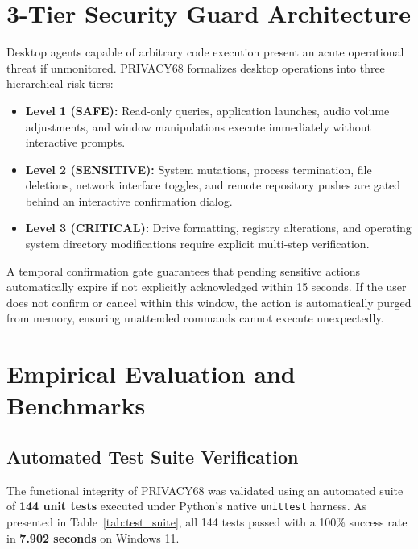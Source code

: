 \documentclass[conference]{IEEEtran}
\begin{document}
\section{3-Tier Security Guard Architecture}
\label{sec:security}
Desktop agents capable of arbitrary code execution present an acute operational threat if unmonitored. PRIVACY68 formalizes desktop operations into three hierarchical risk tiers:
\begin{itemize}
    \item \textbf{Level 1 (SAFE):} Read-only queries, application launches, audio volume adjustments, and window manipulations execute immediately without interactive prompts.
    \item \textbf{Level 2 (SENSITIVE):} System mutations, process termination, file deletions, network interface toggles, and remote repository pushes are gated behind an interactive confirmation dialog.
    \item \textbf{Level 3 (CRITICAL):} Drive formatting, registry alterations, and operating system directory modifications require explicit multi-step verification.
\end{itemize}

A temporal confirmation gate guarantees that pending sensitive actions automatically expire if not explicitly acknowledged within 15 seconds. If the user does not confirm or cancel within this window, the action is automatically purged from memory, ensuring unattended commands cannot execute unexpectedly.

\section{Empirical Evaluation and Benchmarks}
\label{sec:evaluation}

\subsection{Automated Test Suite Verification}
The functional integrity of PRIVACY68 was validated using an automated suite of \textbf{144 unit tests} executed under Python's native \texttt{unittest} harness. As presented in Table~\ref{tab:test_suite}, all 144 tests passed with a 100\% success rate in \textbf{7.902 seconds} on Windows 11.
\end{document}
